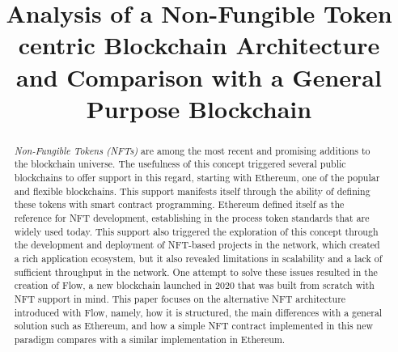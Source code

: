 \documentclass[conference]{IEEEtran}
\begin{document}
\title{Analysis of a Non-Fungible Token centric Blockchain Architecture and Comparison with a General Purpose Blockchain}

\author{
    \and
    \and
    \and
}

\maketitle

\begin{abstract}
    \textit{Non-Fungible Tokens (NFTs)} are among the most recent and promising additions to the blockchain universe. The usefulness of this concept triggered several public blockchains to offer support in this regard, starting with Ethereum, one of the popular and flexible blockchains. This support manifests itself through the ability of defining these tokens with smart contract programming. Ethereum defined itself as the reference for NFT development, establishing in the process token standards that are widely used today. This support also triggered the exploration of this concept through the development and deployment of NFT-based projects in the network, which created a rich application ecosystem, but it also revealed limitations in scalability and a lack of sufficient throughput in the network. One attempt to solve these issues resulted in the creation of Flow, a new blockchain launched in 2020 that was built from scratch with NFT support in mind. This paper focuses on the alternative NFT architecture introduced with Flow, namely, how it is structured, the main differences with a general solution such as Ethereum, and how a simple NFT contract implemented in this new paradigm compares with a similar implementation in Ethereum.
\end{abstract}
\end{document}
